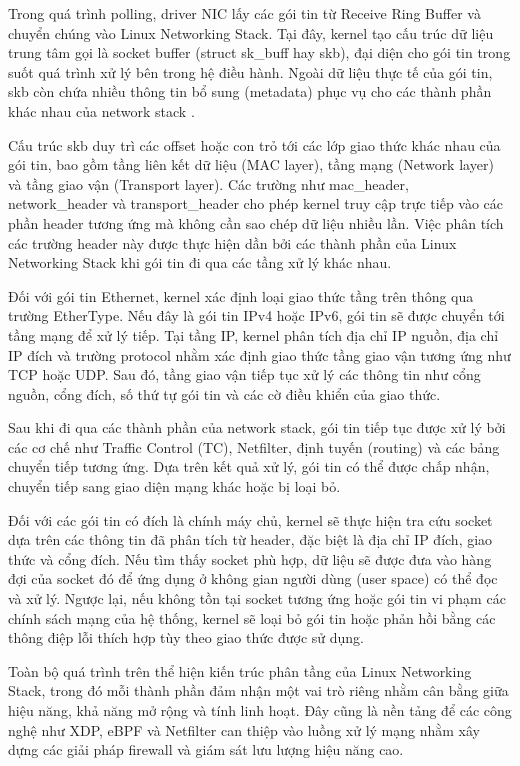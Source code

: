 \documentclass[../DoAn.tex]{subfiles}
\begin{document}
Trong quá trình polling, driver NIC lấy các gói tin từ Receive Ring Buffer và chuyển chúng vào Linux Networking Stack. Tại đây, kernel tạo cấu trúc dữ liệu trung tâm gọi là socket buffer (struct sk\_buff hay skb), đại diện cho gói tin trong suốt quá trình xử lý bên trong hệ điều hành. Ngoài dữ liệu thực tế của gói tin, skb còn chứa nhiều thông tin bổ sung (metadata) phục vụ cho các thành phần khác nhau của network stack \cite{linux_skbuff}.

Cấu trúc skb duy trì các offset hoặc con trỏ tới các lớp giao thức khác nhau của gói tin, bao gồm tầng liên kết dữ liệu (MAC layer), tầng mạng (Network layer) và tầng giao vận (Transport layer). Các trường như mac\_header, network\_header và transport\_header cho phép kernel truy cập trực tiếp vào các phần header tương ứng mà không cần sao chép dữ liệu nhiều lần. Việc phân tích các trường header này được thực hiện dần bởi các thành phần của Linux Networking Stack khi gói tin đi qua các tầng xử lý khác nhau.

Đối với gói tin Ethernet, kernel xác định loại giao thức tầng trên thông qua trường EtherType. Nếu đây là gói tin IPv4 hoặc IPv6, gói tin sẽ được chuyển tới tầng mạng để xử lý tiếp. Tại tầng IP, kernel phân tích địa chỉ IP nguồn, địa chỉ IP đích và trường protocol nhằm xác định giao thức tầng giao vận tương ứng như TCP hoặc UDP. Sau đó, tầng giao vận tiếp tục xử lý các thông tin như cổng nguồn, cổng đích, số thứ tự gói tin và các cờ điều khiển của giao thức.

Sau khi đi qua các thành phần của network stack, gói tin tiếp tục được xử lý bởi các cơ chế như Traffic Control (TC), Netfilter, định tuyến (routing) và các bảng chuyển tiếp tương ứng. Dựa trên kết quả xử lý, gói tin có thể được chấp nhận, chuyển tiếp sang giao diện mạng khác hoặc bị loại bỏ.

Đối với các gói tin có đích là chính máy chủ, kernel sẽ thực hiện tra cứu socket dựa trên các thông tin đã phân tích từ header, đặc biệt là địa chỉ IP đích, giao thức và cổng đích. Nếu tìm thấy socket phù hợp, dữ liệu sẽ được đưa vào hàng đợi của socket đó để ứng dụng ở không gian người dùng (user space) có thể đọc và xử lý. Ngược lại, nếu không tồn tại socket tương ứng hoặc gói tin vi phạm các chính sách mạng của hệ thống, kernel sẽ loại bỏ gói tin hoặc phản hồi bằng các thông điệp lỗi thích hợp tùy theo giao thức được sử dụng.

Toàn bộ quá trình trên thể hiện kiến trúc phân tầng của Linux Networking Stack, trong đó mỗi thành phần đảm nhận một vai trò riêng nhằm cân bằng giữa hiệu năng, khả năng mở rộng và tính linh hoạt. Đây cũng là nền tảng để các công nghệ như XDP, eBPF và Netfilter can thiệp vào luồng xử lý mạng nhằm xây dựng các giải pháp firewall và giám sát lưu lượng hiệu năng cao.
\end{document}
